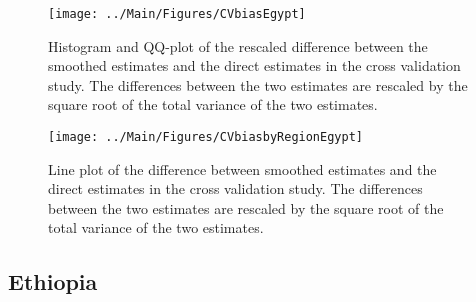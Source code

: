 \documentclass[12pt]{article}\usepackage[]{graphicx}\usepackage[]{color}
\newenvironment{knitrout}{}{} %
\begin{document}
\begin{knitrout}
\color{fgcolor}\begin{figure}[bht]

{\centering \texttt{[image: ../Main/Figures/CVbiasEgypt]} 

}

\caption[Histogram and QQ-plot of the rescaled difference between the smoothed estimates and the direct estimates in the cross validation study]{Histogram and QQ-plot of the rescaled difference between the smoothed estimates and the direct estimates in the cross validation study. The differences between the two estimates are rescaled by the square root of the total variance of the two estimates.}\label{fig:unnamed-chunk-109}
\end{figure}


\end{knitrout}

\begin{knitrout}
\color{fgcolor}\begin{figure}[bht]

{\centering \texttt{[image: ../Main/Figures/CVbiasbyRegionEgypt]} 

}

\caption[Line plot of the difference between smoothed estimates and the direct estimates in the cross validation study]{Line plot of the difference between smoothed estimates and the direct estimates in the cross validation study. The differences between the two estimates are rescaled by the square root of the total variance of the two estimates.}\label{fig:unnamed-chunk-110}
\end{figure}


\end{knitrout}


\clearpage
\subsection{Ethiopia}


\end{document}
